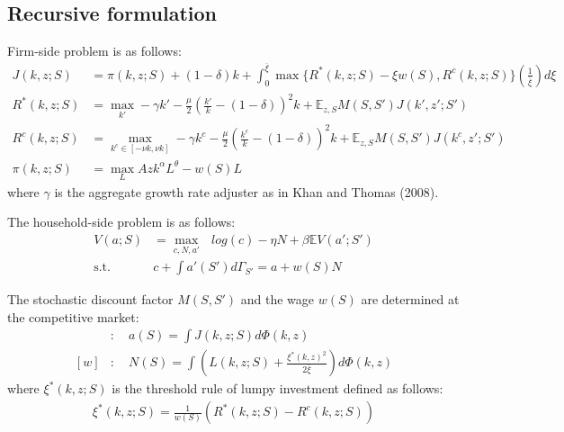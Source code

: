 \subsection*{Recursive formulation}
Firm-side problem is as follows:
\begin{align*}
  J(k,z;S) &= \pi(k,z;S) + (1-\delta)k + \int_{0}^{\overline{\xi}} \max\{R^{*}(k,z;S)-\xi w(S),R^{c}(k,z;S)\}\left(\frac{1}{\overline{\xi}}\right)d\xi
  \\
  R^{*}(k,z;S) &= \max_{k'} -\gamma k' - \frac{\mu}{2}\left(\frac{k'}{k}-(1-\delta)\right)^{2}k+ \mathbb{E}_{z,S} M(S,S') J(k',z';S')
  \\
  R^{c}(k,z;S) &= \max_{k^{c}\in[-\nu k,\nu k]} -\gamma k^{c} - \frac{\mu}{2}\left(\frac{k^{c}}{k}-(1-\delta)\right)^{2}k+ \mathbb{E}_{z,S} M(S,S') J(k^{c},z';S')
  \\
  \pi(k,z;S) &=  \max_{L} Azk^{\alpha}L^{\theta} - w(S)L
\end{align*}
where $\gamma$ is the aggregate growth rate adjuster as in Khan and Thomas (2008).

The household-side problem is as follows:
\begin{align*}
  V(a;S) &= \max_{c,N,a'}\text{ } log(c) - \eta N + \beta \mathbb{E}V(a';S')
  \\
  \text{s.t.}\quad& c + \int a'(S') d\Gamma_{S'} =  a + w(S)N
\end{align*}

The stochastic discount factor $M(S,S')$ and the wage $w(S)$ are determined at the competitive market:
\begin{align*}
  [M]&:\quad a(S) = \int J(k,z;S) d\Phi(k,z)
  \\
  [w]&:\quad N(S) = \int \left(L(k,z;S) + \frac{\xi^{*}(k,z)^{2}}{2\overline{\xi}}\right) d\Phi(k,z)
\end{align*}
where $\xi^{*}(k,z;S)$ is the threshold rule of lumpy investment defined as follows:
\begin{align*}
  \xi^{*}(k,z;S) = \frac{1}{w(S)}\left(R^{*}(k,z;S) - R^{c}(k,z;S)\right)
\end{align*}

